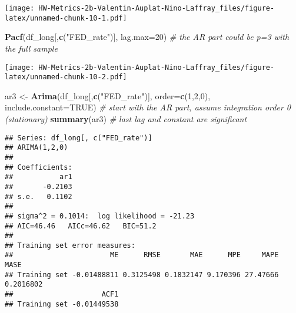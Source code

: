 \documentclass[
]{article}
\newenvironment{Shaded}{\begin{snugshade}}{\end{snugshade}}
\newcommand{\AttributeTok}[1]{\textcolor[rgb]{0.13,0.29,0.53}{#1}}
\newcommand{\CommentTok}[1]{\textcolor[rgb]{0.56,0.35,0.01}{\textit{#1}}}
\newcommand{\ConstantTok}[1]{\textcolor[rgb]{0.56,0.35,0.01}{#1}}
\newcommand{\DecValTok}[1]{\textcolor[rgb]{0.00,0.00,0.81}{#1}}
\newcommand{\FunctionTok}[1]{\textcolor[rgb]{0.13,0.29,0.53}{\textbf{#1}}}
\newcommand{\NormalTok}[1]{#1}
\newcommand{\OtherTok}[1]{\textcolor[rgb]{0.56,0.35,0.01}{#1}}
\newcommand{\SpecialCharTok}[1]{\textcolor[rgb]{0.81,0.36,0.00}{\textbf{#1}}}
\newcommand{\StringTok}[1]{\textcolor[rgb]{0.31,0.60,0.02}{#1}}
\begin{document}
\texttt{[image: HW-Metrics-2b-Valentin-Auplat-Nino-Laffray\_files/figure-latex/unnamed-chunk-10-1.pdf]}

\begin{Shaded}
\begin{Highlighting}[]
\FunctionTok{Pacf}\NormalTok{(df\_long[,}\FunctionTok{c}\NormalTok{(}\StringTok{"FED\_rate"}\NormalTok{)], }\AttributeTok{lag.max=}\DecValTok{20}\NormalTok{) }\CommentTok{\# the AR part could be p=3 with the full sample}
\end{Highlighting}
\end{Shaded}

\texttt{[image: HW-Metrics-2b-Valentin-Auplat-Nino-Laffray\_files/figure-latex/unnamed-chunk-10-2.pdf]}

\begin{Shaded}
\begin{Highlighting}[]
\NormalTok{ar3 }\OtherTok{\textless{}{-}} \FunctionTok{Arima}\NormalTok{(df\_long[,}\FunctionTok{c}\NormalTok{(}\StringTok{"FED\_rate"}\NormalTok{)], }\AttributeTok{order=}\FunctionTok{c}\NormalTok{(}\DecValTok{1}\NormalTok{,}\DecValTok{2}\NormalTok{,}\DecValTok{0}\NormalTok{), }\AttributeTok{include.constant=}\ConstantTok{TRUE}\NormalTok{) }\CommentTok{\# start with the AR part, assume integration order 0 (stationary)}
\FunctionTok{summary}\NormalTok{(ar3) }\CommentTok{\# last lag and constant are significant}
\end{Highlighting}
\end{Shaded}

\begin{verbatim}
## Series: df_long[, c("FED_rate")] 
## ARIMA(1,2,0) 
## 
## Coefficients:
##           ar1
##       -0.2103
## s.e.   0.1102
## 
## sigma^2 = 0.1014:  log likelihood = -21.23
## AIC=46.46   AICc=46.62   BIC=51.2
## 
## Training set error measures:
##                       ME      RMSE       MAE      MPE     MAPE      MASE
## Training set -0.01488811 0.3125498 0.1832147 9.170396 27.47666 0.2016802
##                     ACF1
## Training set -0.01449538
\end{verbatim}

\begin{Shaded}
\end{Shaded}
\end{document}
